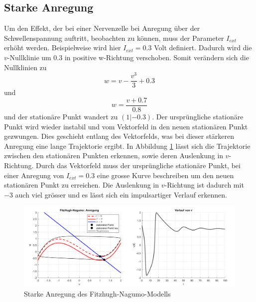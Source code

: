 \begin{refsection}
\subsection{Starke Anregung}
Um den Effekt, der bei einer Nervenzelle bei Anregung über der Schwellenspannung auftritt, beobachten zu können, muss
der Parameter $I_{ext}$ erhöht werden.
Beispielweise wird hier $I_{ext} = 0.3$ Volt definiert.
Dadurch wird die $v$-Nullklinie um 0.3 in positive w-Richtung verschoben.
Somit verändern sich die Nullklinien zu 
\[ w = v - \frac{v^3}{3} + 0.3\]
und \[w = \frac{v + 0.7}{0.8}\] und der stationäre Punkt wandert zu $(1 |-0.3)$.
Der ursprüngliche stationäre Punkt wird wieder instabil und vom Vektorfeld in den neuen stationären Punkt
gezwungen.
Dies geschieht entlang des Vektorfelds, was bei dieser stärkeren Anregung eine lange Trajektorie ergibt.
In Abbildung \ref{fig:starkeAnregung} lässt sich die Trajektorie zwischen den stationären Punkten erkennen, sowie
deren Auslenkung in $v$-Richtung.
Durch das Vektorfeld muss der ursprüngliche stationäre Punkt, bei einer Anregung von $I_{ext} = 0.3$ eine grosse Kurve
beschreiben um den neuen stationären Punkt zu erreichen.
Die Auslenkung in $v$-Richtung ist dadurch mit $-3$ auch viel grösser und es lässt sich ein impulsartiger Verlauf erkennen.
\begin{figure}[H]
    \centering
    \includegraphics[width=\textwidth]{papers/nerven/Bilder/starkeAnregung.png}
    \caption{Starke Anregung des Fitzhugh-Nagumo-Modells}
    \label{fig:starkeAnregung}
\end{figure}
\cite{nerven:InaLammers.31.08.2015}

\end{refsection}
